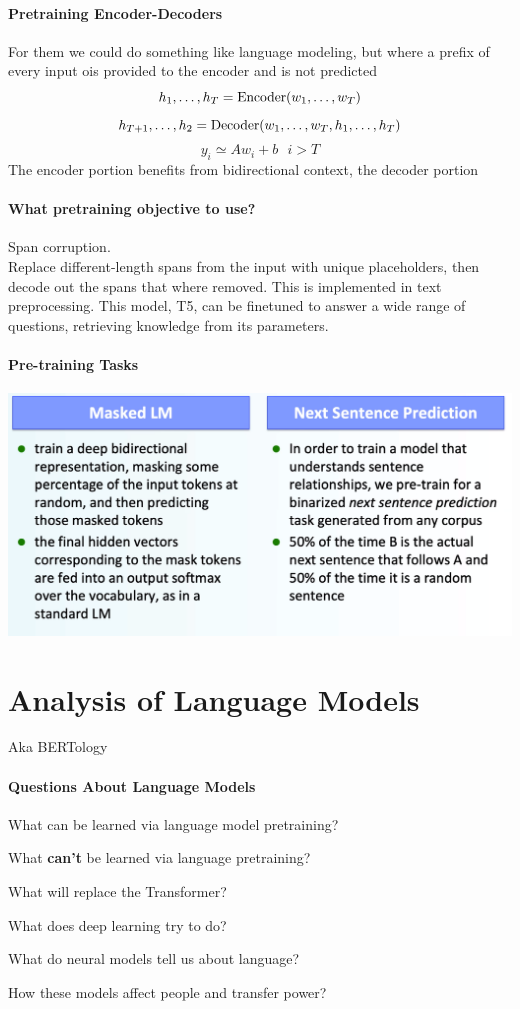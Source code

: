 \documentclass[10pt]{report}
\begin{document}
\paragraph{Pretraining Encoder-Decoders} For them we could do something like language modeling, but where a prefix of every input ois provided to the encoder and is not predicted
$$h_1,\ldots,h_T = \hbox{Encoder}(w_1,\ldots,w_T)$$
$$h_{T+1},\ldots,h_2 = \hbox{Decoder}(w_1,\ldots,w_T,h_1,\ldots,h_T)$$
$$y_i\simeq Aw_i+b\:\:\:i>T$$
The encoder portion benefits from bidirectional context, the decoder portion %
\paragraph{What pretraining objective to use?} Span corruption.\\
Replace different-length spans from the input with unique placeholders, then decode out the spans that where removed. This is implemented in text preprocessing. This model, T5, can be finetuned to answer a wide range of questions, retrieving knowledge from its parameters.
\paragraph{Pre-training Tasks}
\begin{center}
	\includegraphics[scale=0.5]{77.png} %
\end{center}
\section{Analysis of Language Models}
Aka BERTology
\paragraph{Questions About Language Models} \begin{list}{}{}
	\item What can be learned via language model pretraining?
	\item What \textbf{can't} be learned via language pretraining?
	\item What will replace the Transformer?
	\item What does deep learning try to do?
	\item What do neural models tell us about language?
	\item How these models affect people and transfer power? 
\end{list}
\end{document}
